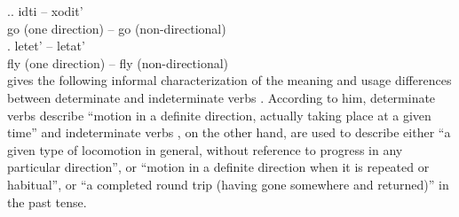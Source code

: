 \ex.\label{ex.verbs}\ag. idti -- xodit'\\
{go (one direction)} -- {go (non-directional)}\\
\bg. letet' -- letat'\\
{fly (one direction)} -- {fly (non-directional)}\\

\citet[3f]{Stilman:51} gives the following informal characterization of the meaning and usage differences between determinate and indeterminate verbs . According to him, determinate verbs  describe ``motion in a definite direction, actually taking place at a given time'' and indeterminate verbs , on the other hand, are used to describe either ``a given type of locomotion  in general, without reference to progress in any particular direction'', or ``motion in a definite direction when it is repeated or habitual'', or ``a completed round trip (having gone somewhere and returned)'' in the past  tense.

